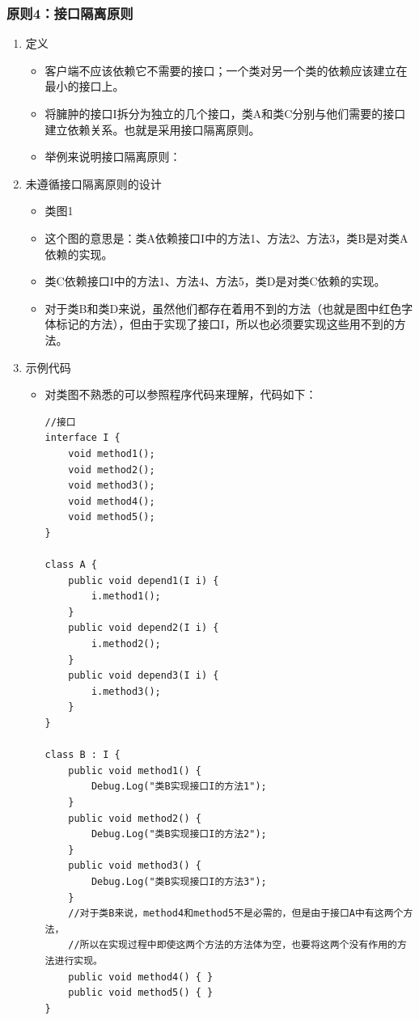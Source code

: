 \documentclass[9pt, b5paper]{article}
\begin{document}
\subsubsection{原则4：接口隔离原则}
\label{sec:orge9a1ee9}
\begin{enumerate}
\item 定义
\label{sec:org3787a71}
\begin{itemize}
\item 客户端不应该依赖它不需要的接口；一个类对另一个类的依赖应该建立在最小的接口上。
\item 将臃肿的接口I拆分为独立的几个接口，类A和类C分别与他们需要的接口建立依赖关系。也就是采用接口隔离原则。
\item 举例来说明接口隔离原则：
\end{itemize}
\item 未遵循接口隔离原则的设计
\label{sec:orgd12e5d5}
\begin{itemize}
\item 类图1
\item 这个图的意思是：类A依赖接口I中的方法1、方法2、方法3，类B是对类A依赖的实现。
\item 类C依赖接口I中的方法1、方法4、方法5，类D是对类C依赖的实现。
\item 对于类B和类D来说，虽然他们都存在着用不到的方法（也就是图中红色字体标记的方法），但由于实现了接口I，所以也必须要实现这些用不到的方法。
\end{itemize}
\item 示例代码
\label{sec:org35bfe3d}
\begin{itemize}
\item 对类图不熟悉的可以参照程序代码来理解，代码如下：
\begin{verbatim}
//接口
interface I {
    void method1();
    void method2();
    void method3();
    void method4();
    void method5();
}

class A {
    public void depend1(I i) {
        i.method1();
    }
    public void depend2(I i) {
        i.method2();
    }
    public void depend3(I i) {
        i.method3();
    }
}

class B : I {
    public void method1() {
        Debug.Log("类B实现接口I的方法1");
    }
    public void method2() {
        Debug.Log("类B实现接口I的方法2");
    }
    public void method3() {
        Debug.Log("类B实现接口I的方法3");
    }
    //对于类B来说，method4和method5不是必需的，但是由于接口A中有这两个方法，
    //所以在实现过程中即使这两个方法的方法体为空，也要将这两个没有作用的方法进行实现。
    public void method4() { }
    public void method5() { }
}


\end{verbatim}
\end{itemize}
\end{enumerate}
\end{document}
